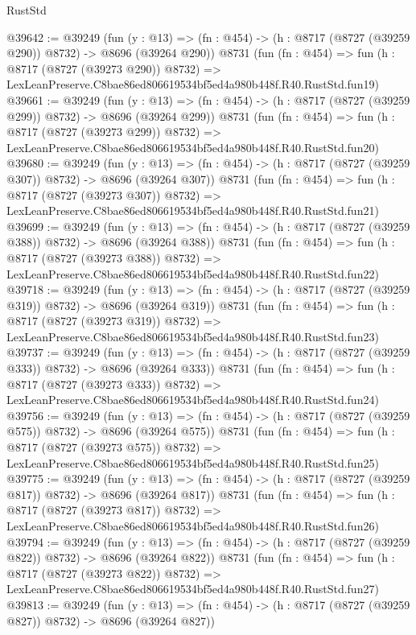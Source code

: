 \begin{lexlean}{RustStd}
\begin{coremodule}
@39642 := @39249
    (fun (y : @13) => (fn : @454) -> (h : @8717 (@8727 (@39259 @290)) @8732) -> @8696 (@39264 @290))
    @8731
    (fun (fn : @454) =>
    fun (h : @8717 (@8727 (@39273 @290)) @8732) =>
    LexLeanPreserve.C8bae86ed806619534bf5ed4a980b448f.R40.RustStd.fun19)
@39661 := @39249
    (fun (y : @13) => (fn : @454) -> (h : @8717 (@8727 (@39259 @299)) @8732) -> @8696 (@39264 @299))
    @8731
    (fun (fn : @454) =>
    fun (h : @8717 (@8727 (@39273 @299)) @8732) =>
    LexLeanPreserve.C8bae86ed806619534bf5ed4a980b448f.R40.RustStd.fun20)
@39680 := @39249
    (fun (y : @13) => (fn : @454) -> (h : @8717 (@8727 (@39259 @307)) @8732) -> @8696 (@39264 @307))
    @8731
    (fun (fn : @454) =>
    fun (h : @8717 (@8727 (@39273 @307)) @8732) =>
    LexLeanPreserve.C8bae86ed806619534bf5ed4a980b448f.R40.RustStd.fun21)
@39699 := @39249
    (fun (y : @13) => (fn : @454) -> (h : @8717 (@8727 (@39259 @388)) @8732) -> @8696 (@39264 @388))
    @8731
    (fun (fn : @454) =>
    fun (h : @8717 (@8727 (@39273 @388)) @8732) =>
    LexLeanPreserve.C8bae86ed806619534bf5ed4a980b448f.R40.RustStd.fun22)
@39718 := @39249
    (fun (y : @13) => (fn : @454) -> (h : @8717 (@8727 (@39259 @319)) @8732) -> @8696 (@39264 @319))
    @8731
    (fun (fn : @454) =>
    fun (h : @8717 (@8727 (@39273 @319)) @8732) =>
    LexLeanPreserve.C8bae86ed806619534bf5ed4a980b448f.R40.RustStd.fun23)
@39737 := @39249
    (fun (y : @13) => (fn : @454) -> (h : @8717 (@8727 (@39259 @333)) @8732) -> @8696 (@39264 @333))
    @8731
    (fun (fn : @454) =>
    fun (h : @8717 (@8727 (@39273 @333)) @8732) =>
    LexLeanPreserve.C8bae86ed806619534bf5ed4a980b448f.R40.RustStd.fun24)
@39756 := @39249
    (fun (y : @13) => (fn : @454) -> (h : @8717 (@8727 (@39259 @575)) @8732) -> @8696 (@39264 @575))
    @8731
    (fun (fn : @454) =>
    fun (h : @8717 (@8727 (@39273 @575)) @8732) =>
    LexLeanPreserve.C8bae86ed806619534bf5ed4a980b448f.R40.RustStd.fun25)
@39775 := @39249
    (fun (y : @13) => (fn : @454) -> (h : @8717 (@8727 (@39259 @817)) @8732) -> @8696 (@39264 @817))
    @8731
    (fun (fn : @454) =>
    fun (h : @8717 (@8727 (@39273 @817)) @8732) =>
    LexLeanPreserve.C8bae86ed806619534bf5ed4a980b448f.R40.RustStd.fun26)
@39794 := @39249
    (fun (y : @13) => (fn : @454) -> (h : @8717 (@8727 (@39259 @822)) @8732) -> @8696 (@39264 @822))
    @8731
    (fun (fn : @454) =>
    fun (h : @8717 (@8727 (@39273 @822)) @8732) =>
    LexLeanPreserve.C8bae86ed806619534bf5ed4a980b448f.R40.RustStd.fun27)
@39813 := @39249
    (fun (y : @13) => (fn : @454) -> (h : @8717 (@8727 (@39259 @827)) @8732) -> @8696 (@39264 @827))

\end{coremodule}
\end{lexlean}
